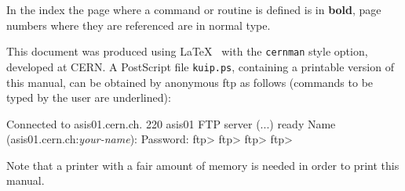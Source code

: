In the index the page where a command or routine is defined is in {\bf bold},
page numbers where they are referenced are in normal type.

This document was produced using \LaTeX~\cite{bib-LATEX}
with the {\tt cernman} style option, developed at CERN. 
A PostScript file {\tt kuip.ps}, containing a printable version
of this manual, can be obtained by anonymous ftp as follows
(commands to be typed by the user are underlined):      

\begin{XMP}
Connected to asis01.cern.ch.
220 asis01 FTP server (...) ready
Name (asis01.cern.ch:\textsl{your-name}): 
Password: 
ftp> 
ftp> 
ftp> 
ftp> 
\end{XMP}
Note that a printer with a fair amount of memory is needed in order to
print this manual.

\newpage 
\tableofcontents
\listoftables
\newpage
\listoffigures
